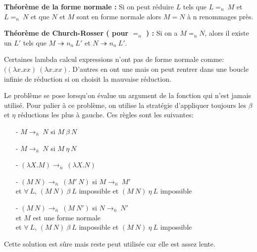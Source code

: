 \documentclass[10pt,a4paper]{report}
\begin{document}
\textbf{Théorème de la forme normale :}
Si on peut réduire $L$ tels que $L =_{n}~M$ et $L =_{n}~N$ et que $N$ et $M$ sont en forme normale alors $M = N$ à n renommages près.
\medbreak	

\textbf{Théorème de Church-Rosser ( pour $=_{n}$ ) :}
Si on a $M =_{n} N$, alors il existe un $L'$ tels que $M \twoheadrightarrow n_{n}~L'$ et $N \twoheadrightarrow n_{n}~L'$.
\medbreak

Certaines lambda calcul expressions n'ont pas de forme normale comme: $((\lambda x.x x)~(\lambda x.x x)$. 
D'autres en ont une mais on peut rentrer dans une boucle infinie de réduction si on choisit la mauvaise réduction.
\medbreak

Le problème se pose lorsqu'on évalue un argument de la fonction qui n'est jamais utilisé. Pour palier à ce problème, on utilise la stratégie d'appliquer toujours les $\beta$ et $\eta$ réductions les plus à gauche. Ces règles sont les suivantes:
\begin{itemize}
\item[-] $M \longrightarrow_{\bar{n}}~N$ si $M~\beta~N$
\item[-] $M \longrightarrow_{\bar{n}}~N$ si $M~\eta~N$
\item[-] $(\lambda X.M) \longrightarrow_{\bar{n}}~(\lambda X.N)$
\item[-] $(M~N) \longrightarrow_{\bar{n}}~(M'~N)$ si $M \longrightarrow_{\bar{n}}~M'$
  \\ et $\forall~L$, $(M~N)~\beta~L$ impossible et $(M~N)~\eta~L$ impossible
\item[-] $(M~N) \longrightarrow_{\bar{n}}~(M~N')$ si $N \longrightarrow_{\bar{n}}~N'$
  \\ et $M$ est une forme normale
  \\ et  $\forall~L$, $(M~N)~\beta~L$ impossible et $(M~N)~\eta~L$ impossible
\end{itemize}
\smallbreak
Cette solution est sûre mais reste peut utilisée car elle est assez lente.
\medbreak
\end{document}
